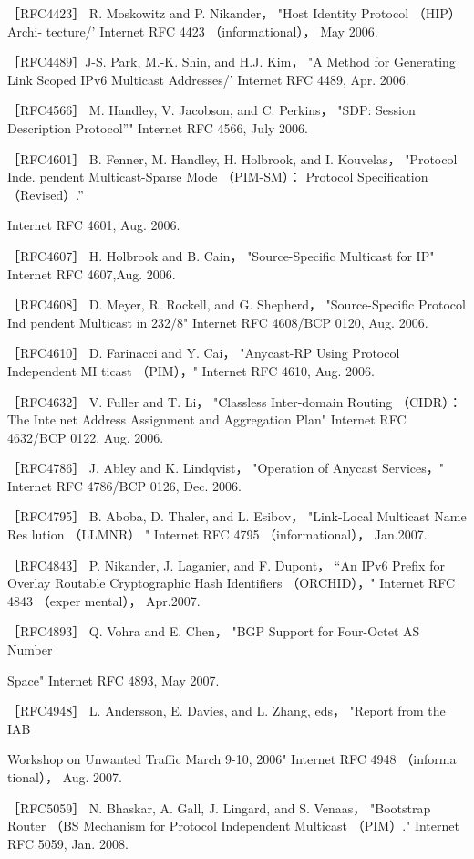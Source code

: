 ［RFC4423］ R. Moskowitz and P. Nikander， "Host Identity Protocol （HIP） Archi-
tecture/' Internet RFC 4423 （informational）， May 2006.

［RFC4489］J-S. Park, M.-K. Shin, and H.J. Kim， "A Method for Generating Link
Scoped IPv6 Multicast Addresses/' Internet RFC 4489, Apr. 2006.

［RFC4566］ M. Handley, V. Jacobson, and C. Perkins， "SDP: Session Description
Protocol”" Internet RFC 4566, July 2006.

［RFC4601］ B. Fenner, M. Handley, H. Holbrook, and I. Kouvelas， "Protocol Inde.
pendent Multicast-Sparse Mode （PIM-SM）： Protocol Specification （Revised）.”

Internet RFC 4601, Aug. 2006.

［RFC4607］ H. Holbrook and B. Cain， "Source-Specific Multicast for IP" Internet
RFC 4607,Aug. 2006.

［RFC4608］ D. Meyer, R. Rockell, and G. Shepherd， "Source-Specific Protocol Ind
pendent Multicast in 232/8" Internet RFC 4608/BCP 0120, Aug. 2006.

［RFC4610］ D. Farinacci and Y. Cai， "Anycast-RP Using Protocol Independent MI
ticast （PIM），" Internet RFC 4610, Aug. 2006.

［RFC4632］ V. Fuller and T. Li， "Classless Inter-domain Routing （CIDR）： The Inte
net Address Assignment and Aggregation Plan" Internet RFC 4632/BCP 0122.
Aug. 2006.

［RFC4786］ J. Abley and K. Lindqvist， "Operation of Anycast Services，" Internet
RFC 4786/BCP 0126, Dec. 2006.

［RFC4795］ B. Aboba, D. Thaler, and L. Esibov， "Link-Local Multicast Name Res
lution （LLMNR） " Internet RFC 4795 （informational）， Jan.2007.

［RFC4843］ P. Nikander, J. Laganier, and F. Dupont， “An IPv6 Prefix for Overlay
Routable Cryptographic Hash Identifiers （ORCHID），" Internet RFC 4843 （exper
mental）， Apr.2007.

［RFC4893］ Q. Vohra and E. Chen， "BGP Support for Four-Octet AS Number

Space" Internet RFC 4893, May 2007.

［RFC4948］ L. Andersson, E. Davies, and L. Zhang, eds， "Report from the IAB

Workshop on Unwanted Traffic March 9-10, 2006" Internet RFC 4948 （informa
tional）， Aug. 2007.

［RFC5059］ N. Bhaskar, A. Gall, J. Lingard, and S. Venaas， "Bootstrap Router （BS
Mechanism for Protocol Independent Multicast （PIM）." Internet RFC 5059, Jan.
2008.

